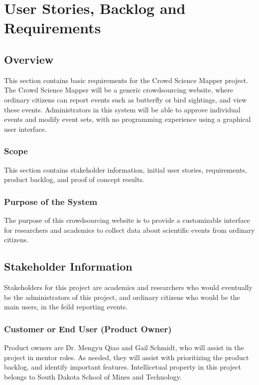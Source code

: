 \chapter{User Stories, Backlog and Requirements}
\section{Overview}

This section contains basic requirements for the Crowd Science Mapper project. The Crowd Science Mapper will be a generic crowdsourcing website, where ordinary citizens can report events such as butterfly or bird sightings, and view these events. Administrators in this system will be able to approve individual events and modify event sets, with no programming experience using a graphical user interface.

\subsection{Scope}

This section contains stakeholder information, initial user stories, requirements, product backlog, and proof of concept results.

\subsection{Purpose of the System}
The purpose of this crowdsourcing website is to provide a customizable interface for researchers and academics to collect data about scientific events from ordinary citizens. 

\section{ Stakeholder Information}

Stakeholders for this project are academics and researchers who would eventually be the administrators of this project, and ordinary citizens who would be the main users, in the feild reporting events. 

\subsection{Customer or End User (Product Owner)}

Product owners are Dr. Mengyu Qiao and Gail Schmidt, who will assist in the project in mentor roles. As needed, they will assist with prioritizing the product backlog, and identify important features. Intellicetual property in this project belongs to South Dakota School of Mines and Technology. 

